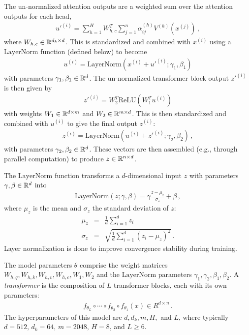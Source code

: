 The un-normalized attention outputs are a weighted sum over the attention outputs for each head,
\begin{eqnarray}
  {u'}^{(i)} = \sum_{h=1}^H W^T_{h,c} \sum_{j=1}^{n} \alpha^{(h)}_{ij} V^{(h)}(x^{(j)})
  \,,
\end{eqnarray}
where $W_{h,c} \in \mathbb{R}^{d_k\times d}$.  This is standardized and combined with $x^{(i)}$ using a $\text{LayerNorm}$ function (defined below) to become
\begin{eqnarray}
  {u}^{(i)} = \text{LayerNorm}\left(  x^{(i)} + {u'}^{(i)}; \gamma_1, \beta_1  \right)
\end{eqnarray}
with parameters $\gamma_1, \beta_1 \in \mathbb{R}^{d}$.  The un-normalized transformer block output ${z'}^{(i)}$ is then given by
\begin{eqnarray}
  {z'}^{(i)} = W_2^T \text{ReLU}\left( W_1^T u^{(i)} \right)
\end{eqnarray}
with weights $W_1\in \mathbb{R}^{d\times m}$ and $W_2\in \mathbb{R}^{m\times d}$.  This is then standardized and combined with $u^{(i)}$ to give the final output $z^{(i)}$:
\begin{eqnarray}
  {z}^{(i)} = \text{LayerNorm}\left(  u^{(i)} + {z'}^{(i)}; \gamma_2, \beta_2  \right)
  \,,
\end{eqnarray}
with parameters $\gamma_2, \beta_2 \in \mathbb{R}^{d}$.  These vectors are then assembled (e.g., through parallel computation) to produce $z\in \mathbb{R}^{n\times d}$.

The $\text{LayerNorm}$ function transforms a $d$-dimensional input $z$ with parameters $\gamma, \beta \in \mathbb{R}^d$ into
\begin{eqnarray}
  \text{LayerNorm}(z; \gamma, \beta) = \gamma \frac{z-\mu_z}{\sigma_z} + \beta
  \,,
\end{eqnarray}
where $\mu_z$ is the mean and $\sigma_z$ the standard deviation of $z$:
\begin{eqnarray}
  \mu_z &=& \frac{1}{d} \sum_{i=1}^d z_i
  \\
  \sigma_z &=& \sqrt{ \frac{1}{d} \sum_{i=1}^d (z_i-\mu_z)^2 }
  \,.
\end{eqnarray}
Layer normalization is done to improve convergence stability during training.

The model parameters $\theta$ comprise the weight matrices $W_{h,q}, W_{h,k}, W_{h,v}, W_{h,c}, W_1, W_2$ and the $\text{LayerNorm}$ parameters $\gamma_1, \gamma_2, \beta_1, \beta_2$.  A {\em transformer} is the composition of $L$ transformer blocks, each with its own parameters:
\begin{eqnarray}
  f_{\theta_L} \circ  \cdots \circ f_{\theta_2} \circ f_{\theta_1}(x) \in R^{d\times n}
  \,.
\end{eqnarray}
The hyperparameters of this model are $d, d_k, m, H,$ and $L$, where typically $d=512$, $d_k = 64$, $m=2048$, $H=8$, and $L\ge 6$.


